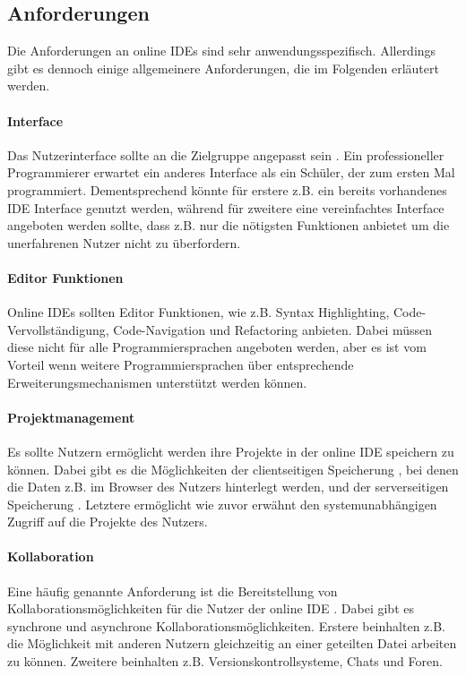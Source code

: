 \subsection{Anforderungen}\label{section:stand-der-technik:literaturrecherche:anforderungen}

Die Anforderungen an online IDEs sind sehr anwendungsspezifisch. Allerdings gibt es dennoch einige allgemeinere Anforderungen, die im Folgenden erläutert werden.

\paragraph{Interface}
Das Nutzerinterface sollte an die Zielgruppe angepasst sein \cite{malan_standardizing_2022}. Ein professioneller Programmierer erwartet ein anderes Interface als ein Schüler, der zum ersten Mal programmiert. Dementsprechend könnte für erstere z.B. ein bereits vorhandenes IDE Interface genutzt werden, während für zweitere eine vereinfachtes Interface angeboten werden sollte, dass z.B. nur die nötigsten Funktionen anbietet um die unerfahrenen Nutzer nicht zu überfordern.

\paragraph{Editor Funktionen}
Online IDEs sollten Editor Funktionen, wie z.B. Syntax Highlighting, Code-Vervollständigung, Code-Navigation und Refactoring anbieten. Dabei müssen diese nicht für alle Programmiersprachen angeboten werden, aber es ist vom Vorteil wenn weitere Programmiersprachen über entsprechende Erweiterungsmechanismen unterstützt werden können.

\paragraph{Projektmanagement}
Es sollte Nutzern ermöglicht werden ihre Projekte in der online IDE speichern zu können. Dabei gibt es die Möglichkeiten der clientseitigen Speicherung \cite{jefferson_pyodideu_2024}, bei denen die Daten z.B. im Browser des Nutzers hinterlegt werden, und der serverseitigen Speicherung \cite{ball_beyond_2015}. Letztere ermöglicht wie zuvor erwähnt den systemunabhängigen Zugriff auf die Projekte des Nutzers.

\paragraph{Kollaboration}
Eine häufig genannte Anforderung ist die Bereitstellung von Kollaborationsmöglichkeiten für die Nutzer der online IDE \cite{goldman_real-time_2011}\cite{ghorashi_jimbo_2016}\cite{warner_codepilot_2017}. Dabei gibt es synchrone und asynchrone Kollaborationsmöglichkeiten. Erstere beinhalten z.B. die Möglichkeit mit anderen Nutzern gleichzeitig an einer geteilten Datei arbeiten zu können. Zweitere beinhalten z.B. Versionskontrollsysteme, Chats und Foren.

